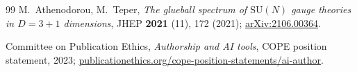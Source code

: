 \documentclass[aps,prl,reprint,amsmath,amssymb,nofootinbib,floatfix,superscriptaddress]{revtex4-2}
\newcommand{\SU}{\mathrm{SU}}
\begin{document}
\begin{thebibliography}{99}
M.~Athenodorou, M.~Teper,
\emph{The glueball spectrum of $\SU(N)$ gauge theories in $D = 3 + 1$ dimensions},
JHEP \textbf{2021} (11), 172 (2021);
\href{https://arxiv.org/abs/2106.00364}{arXiv:2106.00364}.

Committee on Publication Ethics,
\emph{Authorship and AI tools},
COPE position statement, 2023;
\href{https://publicationethics.org/cope-position-statements/ai-author}{publicationethics.org/cope-position-statements/ai-author}.

\end{thebibliography}
\end{document}
